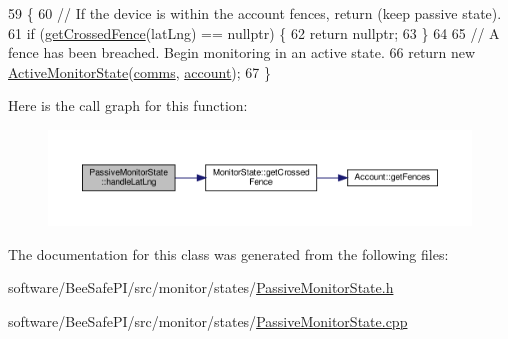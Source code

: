 \begin{DoxyCode}
59 \{
60     \textcolor{comment}{// If the device is within the account fences, return (keep passive state).}
61     \textcolor{keywordflow}{if} (\hyperlink{class_monitor_state_a332c5f42bf46cd217e36f300e5279766}{getCrossedFence}(latLng) == \textcolor{keyword}{nullptr}) \{
62         \textcolor{keywordflow}{return} \textcolor{keyword}{nullptr};
63     \}
64 
65     \textcolor{comment}{// A fence has been breached. Begin monitoring in an active state.}
66     \textcolor{keywordflow}{return} \textcolor{keyword}{new} \hyperlink{class_active_monitor_state}{ActiveMonitorState}(\hyperlink{class_monitor_state_a41914e9963c67ef2d17774f04bad3518}{comms}, \hyperlink{class_monitor_state_a41128d4942ec0d5b107c63d1d95af811}{account});
67 \}
\end{DoxyCode}
Here is the call graph for this function\+:\nopagebreak
\begin{figure}[H]
\begin{center}
\leavevmode
\includegraphics[width=350pt]{dd/d30/class_passive_monitor_state_a173a7c8a4d0b8ecea5928e0c90dec26b_cgraph}
\end{center}
\end{figure}


The documentation for this class was generated from the following files\+:\begin{DoxyCompactItemize}
\item 
software/\+Bee\+Safe\+P\+I/src/monitor/states/\hyperlink{_passive_monitor_state_8h}{Passive\+Monitor\+State.\+h}\item 
software/\+Bee\+Safe\+P\+I/src/monitor/states/\hyperlink{_passive_monitor_state_8cpp}{Passive\+Monitor\+State.\+cpp}\end{DoxyCompactItemize}
